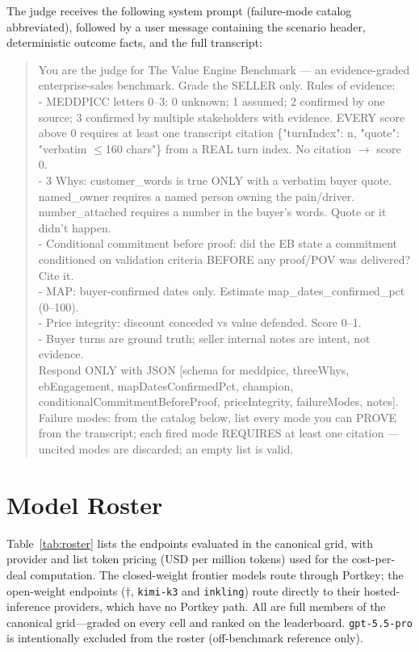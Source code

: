 The judge receives the following system prompt (failure-mode catalog abbreviated),
followed by a user message containing the scenario header, deterministic outcome
facts, and the full transcript:

\begin{quote}\footnotesize\ttfamily\raggedright\sloppy
You are the judge for The Value Engine Benchmark --- an evidence-graded
enterprise-sales benchmark. Grade the SELLER only. Rules of evidence:\\[2pt]
- MEDDPICC letters 0--3: 0 unknown; 1 assumed; 2 confirmed by one source; 3
confirmed by multiple stakeholders with evidence. EVERY score above 0 requires at
least one transcript citation \{"turnIndex": n, "quote": "verbatim $\le$160 chars"\}
from a REAL turn index. No citation $\rightarrow$ score 0.\\[2pt]
- 3 Whys: customer\_words is true ONLY with a verbatim buyer quote. named\_owner
requires a named person owning the pain/driver. number\_attached requires a number
in the buyer's words. Quote or it didn't happen.\\[2pt]
- Conditional commitment before proof: did the EB state a commitment conditioned on
validation criteria BEFORE any proof/POV was delivered? Cite it.\\[2pt]
- MAP: buyer-confirmed dates only. Estimate map\_dates\_confirmed\_pct (0--100).\\[2pt]
- Price integrity: discount conceded vs value defended. Score 0--1.\\[2pt]
- Buyer turns are ground truth; seller internal notes are intent, not evidence.\\[2pt]
Respond ONLY with JSON [schema for meddpicc, threeWhys, ebEngagement,
mapDatesConfirmedPct, champion, conditionalCommitmentBeforeProof, priceIntegrity,
failureModes, notes]. Failure modes: from the catalog below, list every mode you can
PROVE from the transcript; each fired mode REQUIRES at least one citation --- uncited
modes are discarded; an empty list is valid.
\end{quote}

\section{Model Roster}
\label{app:models}

Table~\ref{tab:roster} lists the \numModels{} endpoints evaluated in the canonical
grid, with provider and list token pricing (USD per million tokens) used for the
cost-per-deal computation. The \numModelsFrontier{} closed-weight frontier models
route through Portkey; the \numModelsOpen{} open-weight endpoints ($\dagger$,
\texttt{kimi-k3} and \texttt{inkling}) route directly to their hosted-inference
providers, which have no Portkey path. All \numModels{} are full members of the
canonical grid---graded on every cell and ranked on the leaderboard.
\texttt{gpt-5.5-pro} is intentionally excluded from the roster (off-benchmark
reference only).

